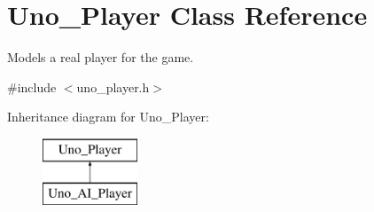 \hypertarget{class_uno___player}{
\section{\-Uno\-\_\-\-Player \-Class \-Reference}
\label{class_uno___player}
}


\-Models a real player for the game.  




{\ttfamily \#include $<$uno\-\_\-player.\-h$>$}

\-Inheritance diagram for \-Uno\-\_\-\-Player\-:\begin{figure}[H]
\begin{center}
\leavevmode
\includegraphics[height=2.000000cm]{class_uno___player}
\end{center}
\end{figure}

